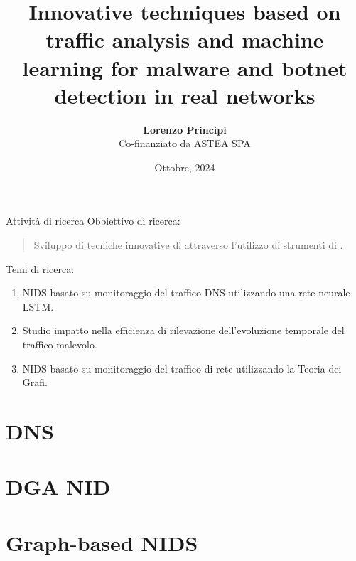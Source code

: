 \documentclass[10pt,xcolor=dvipsnames]{beamer}
\date{Ottobre, 2024} %
\title[{\makebox[.45\paperwidth]{Malware detection \hfill%
       \insertframenumber/\inserttotalframenumber}}]{Innovative techniques based on traffic analysis and machine learning for malware and botnet detection in real networks}
\author[Lorenzo Principi]{{\textbf{\Large Lorenzo Principi}\\\vspace{5mm}Co-finanziato da ASTEA SPA}}
\institute{\vspace{1em}\\
{\large Universit\`a Politecnica delle Marche}\vspace{1em} \\ {\large \href{mailto:l.principi@univpm.it}{l.principi@univpm.it}}}
\begin{document}
\frame[plain]{\titlepage}

\begin{frame}{Attività di ricerca}
  \vfill
  Obbiettivo di ricerca:
  \begin{quote}
      Sviluppo di tecniche innovative di  attraverso l'utilizzo di strumenti di .
  \end{quote}
  
  \pause

  Temi di ricerca:
  \begin{enumerate}
      \item \ac{NIDS} basato su monitoraggio del traffico DNS utilizzando una rete neurale \ac{LSTM}.
      \item Studio impatto nella efficienza di rilevazione dell'evoluzione temporale del traffico malevolo.
      \item \ac{NIDS} basato su monitoraggio del traffico di rete utilizzando la Teoria dei Grafi.
  \end{enumerate}

\end{frame}

\section{DNS}



\section{DGA NID}






\section{Graph-based NIDS}




\end{document}
